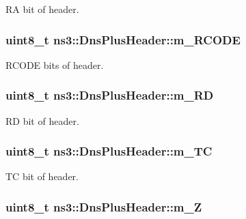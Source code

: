 R\-A bit of header. 

\hypertarget{classns3_1_1DnsPlusHeader_a35835f0ee81cfec4806f85d9b62daca6}{
\subsubsection[{m\-\_\-\-R\-C\-O\-D\-E}]{\setlength{\rightskip}{0pt plus 5cm}uint8\-\_\-t ns3\-::\-Dns\-Plus\-Header\-::m\-\_\-\-R\-C\-O\-D\-E\hspace{0.3cm}{\ttfamily [private]}}}\label{classns3_1_1DnsPlusHeader_a35835f0ee81cfec4806f85d9b62daca6}


R\-C\-O\-D\-E bits of header. 

\hypertarget{classns3_1_1DnsPlusHeader_aceb20feea34744185f0e8fcb0ea4e7f4}{
\subsubsection[{m\-\_\-\-R\-D}]{\setlength{\rightskip}{0pt plus 5cm}uint8\-\_\-t ns3\-::\-Dns\-Plus\-Header\-::m\-\_\-\-R\-D\hspace{0.3cm}{\ttfamily [private]}}}\label{classns3_1_1DnsPlusHeader_aceb20feea34744185f0e8fcb0ea4e7f4}


R\-D bit of header. 

\hypertarget{classns3_1_1DnsPlusHeader_ad6b32f1358164571eb3eba7f083af321}{
\subsubsection[{m\-\_\-\-T\-C}]{\setlength{\rightskip}{0pt plus 5cm}uint8\-\_\-t ns3\-::\-Dns\-Plus\-Header\-::m\-\_\-\-T\-C\hspace{0.3cm}{\ttfamily [private]}}}\label{classns3_1_1DnsPlusHeader_ad6b32f1358164571eb3eba7f083af321}


T\-C bit of header. 

\hypertarget{classns3_1_1DnsPlusHeader_a9fb25d01e3e4ce98158926c2195a20cf}{
\subsubsection[{m\-\_\-\-Z}]{\setlength{\rightskip}{0pt plus 5cm}uint8\-\_\-t ns3\-::\-Dns\-Plus\-Header\-::m\-\_\-\-Z\hspace{0.3cm}{\ttfamily [private]}}}\label{classns3_1_1DnsPlusHeader_a9fb25d01e3e4ce98158926c2195a20cf}


